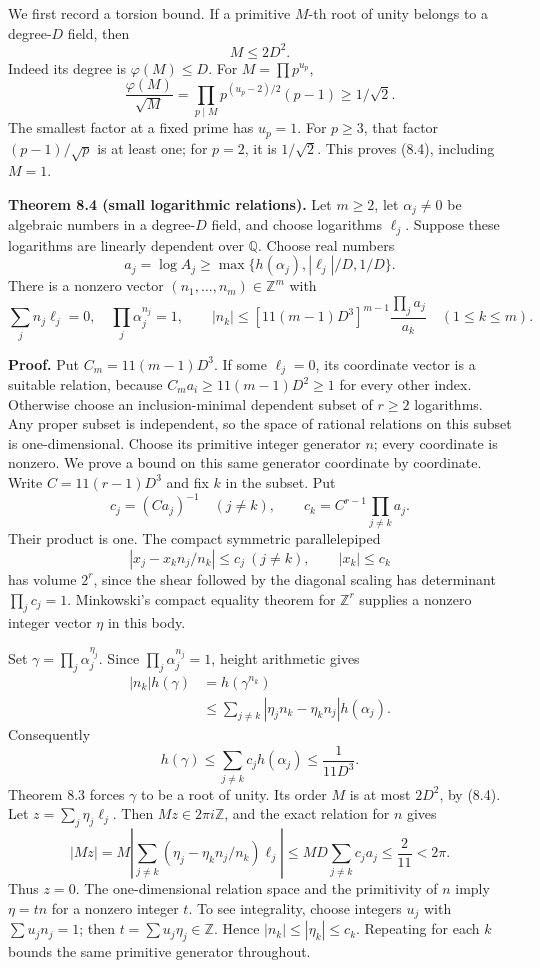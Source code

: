 \documentclass[
  11pt,
  a4paper,
]{article}
\begin{document}
We first record a torsion bound. If a primitive \(M\)-th root of unity
belongs to a degree-\(D\) field, then \[
M\le2D^2. \tag{8.4}
\] Indeed its degree is \(\varphi(M)\le D\). For \(M=\prod p^{u_p}\), \[
\frac{\varphi(M)}{\sqrt M}
=\prod_{p\mid M}p^{(u_p-2)/2}(p-1)\ge1/\sqrt2.
\] The smallest factor at a fixed prime has \(u_p=1\). For \(p\ge3\),
that factor \((p-1)/\sqrt p\) is at least one; for \(p=2\), it is
\(1/\sqrt2\). This proves (8.4), including \(M=1\).

\textbf{Theorem 8.4 (small logarithmic relations).} Let \(m\ge2\), let
\(\alpha_j\ne0\) be algebraic numbers in a degree-\(D\) field, and
choose logarithms \(\ell_j\). Suppose these logarithms are linearly
dependent over \(\mathbb Q\). Choose real numbers \[
a_j=\log A_j\ge\max\{h(\alpha_j),|\ell_j|/D,1/D\}.
\] There is a nonzero vector \((n_1,\ldots,n_m)\in\mathbb Z^m\) with \[
\sum_jn_j\ell_j=0,\quad \prod_j\alpha_j^{n_j}=1,\qquad
|n_k|\le[11(m-1)D^3]^{m-1}\frac{\prod_j a_j}{a_k}
\quad(1\le k\le m). \tag{8.5}
\]

\textbf{Proof.} Put \(C_m=11(m-1)D^3\). If some \(\ell_j=0\), its
coordinate vector is a suitable relation, because
\(C_ma_i\ge11(m-1)D^2\ge1\) for every other index. Otherwise choose an
inclusion-minimal dependent subset of \(r\ge2\) logarithms. Any proper
subset is independent, so the space of rational relations on this subset
is one-dimensional. Choose its primitive integer generator \(n\); every
coordinate is nonzero. We prove a bound on this same generator
coordinate by coordinate. Write \(C=11(r-1)D^3\) and fix \(k\) in the
subset. Put \[
c_j=(Ca_j)^{-1}\quad(j\ne k),\qquad
c_k=C^{r-1}\prod_{j\ne k}a_j.
\] Their product is one. The compact symmetric parallelepiped \[
\left|x_j-x_k n_j/n_k\right|\le c_j\ (j\ne k),\qquad
|x_k|\le c_k
\] has volume \(2^r\), since the shear followed by the diagonal scaling
has determinant \(\prod_jc_j=1\). Minkowski's compact equality theorem
for \(\mathbb Z^r\) supplies a nonzero integer vector \(\eta\) in this
body.

Set \(\gamma=\prod_j\alpha_j^{\eta_j}\). Since
\(\prod_j\alpha_j^{n_j}=1\), height arithmetic gives \[
\begin{aligned}
|n_k|h(\gamma)
&=h(\gamma^{n_k})\\
&\le\sum_{j\ne k}|\eta_jn_k-\eta_kn_j|h(\alpha_j).
\end{aligned}
\] Consequently \[
h(\gamma)\le\sum_{j\ne k}c_jh(\alpha_j)
\le\frac1{11D^3}.
\] Theorem 8.3 forces \(\gamma\) to be a root of unity. Its order \(M\)
is at most \(2D^2\), by (8.4). Let \(z=\sum_j\eta_j\ell_j\). Then
\(Mz\in2\pi i\mathbb Z\), and the exact relation for \(n\) gives \[
|Mz|
=M\left|\sum_{j\ne k}(\eta_j-\eta_kn_j/n_k)\ell_j\right|
\le MD\sum_{j\ne k}c_ja_j
\le\frac2{11}<2\pi.
\] Thus \(z=0\). The one-dimensional relation space and the primitivity
of \(n\) imply \(\eta=tn\) for a nonzero integer \(t\). To see
integrality, choose integers \(u_j\) with \(\sum u_jn_j=1\); then
\(t=\sum u_j\eta_j\in\mathbb Z\). Hence \(|n_k|\le|\eta_k|\le c_k\).
Repeating for each \(k\) bounds the same primitive generator throughout.
\end{document}
